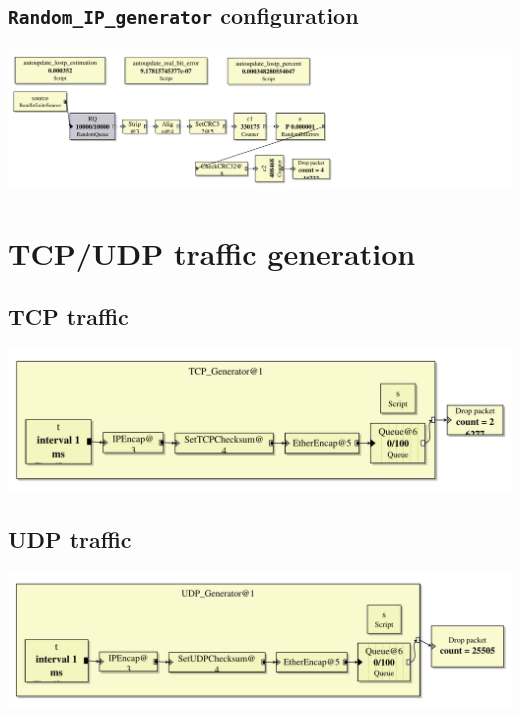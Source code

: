 \documentclass[a4paper]{article}
\begin{document}
  \subsection{\texttt{Random\_IP\_generator} configuration}
  \begin{center}
	  \includegraphics[scale=0.55]{Random_IP_generator.pdf}
	  \label{fig:randomipgenerator}
  \end{center}
  \section{TCP/UDP traffic generation}
  \subsection{TCP traffic}
  \begin{center}
	  \includegraphics[scale=0.55]{TCP_Source.pdf}
	  \label{fig:tcpsource}
  \end{center}
  \subsection{UDP traffic}
    \begin{center}
	  \includegraphics[scale=0.55]{UDP_Source.pdf}
	  \label{fig:udpsource}
  \end{center}
\end{document}
